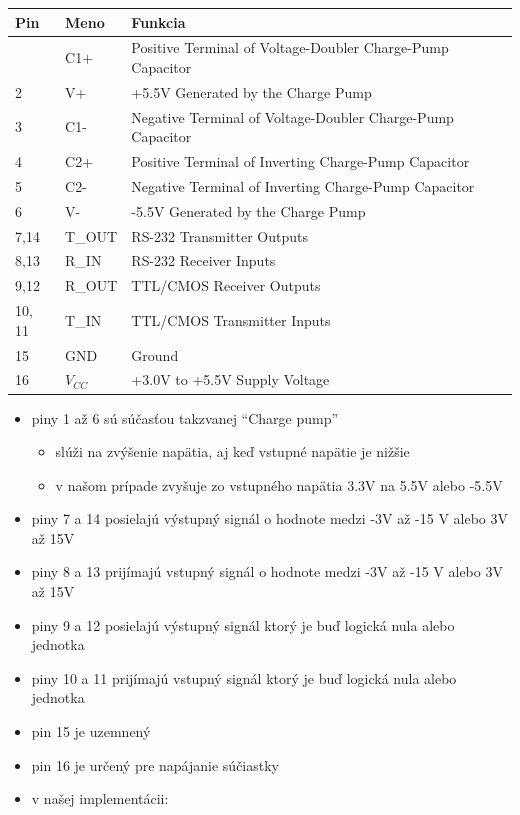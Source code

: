 \begin{itemize}
  \begin{longtable}[]{@{}lll@{}}
  \toprule\noalign{}
  Pin & Meno & Funkcia \\
  \midrule\noalign{}
  \endhead
  \bottomrule\noalign{}
  \endlastfoot
  1 & C1+ & Positive Terminal of Voltage-Doubler Charge-Pump
  Capacitor \\
  2 & V+ & +5.5V Generated by the Charge Pump \\
  3 & C1- & Negative Terminal of Voltage-Doubler Charge-Pump
  Capacitor \\
  4 & C2+ & Positive Terminal of Inverting Charge-Pump Capacitor \\
  5 & C2- & Negative Terminal of Inverting Charge-Pump Capacitor \\
  6 & V- & -5.5V Generated by the Charge Pump \\
  7,14 & T\_OUT & RS-232 Transmitter Outputs \\
  8,13 & R\_IN & RS-232 Receiver Inputs \\
  9,12 & R\_OUT & TTL/CMOS Receiver Outputs \\
  10, 11 & T\_IN & TTL/CMOS Transmitter Inputs \\
  15 & GND & Ground \\
  16 & $V_{CC}$ & +3.0V to +5.5V Supply Voltage \\
  \end{longtable}

  \begin{itemize}
  \item
    piny 1 až 6 sú súčasťou takzvanej ``Charge pump''

    \begin{itemize}
    \item
      slúži na zvýšenie napätia, aj keď vstupné napätie je nižšie
    \item
      v našom prípade zvyšuje zo vstupného napätia 3.3V na 5.5V alebo
      -5.5V
    \end{itemize}
  \item
    piny 7 a 14 posielajú výstupný signál o hodnote medzi -3V až -15 V
    alebo 3V až 15V
  \item
    piny 8 a 13 prijímajú vstupný signál o hodnote medzi -3V až -15 V
    alebo 3V až 15V
  \item
    piny 9 a 12 posielajú výstupný signál ktorý je buď logická nula
    alebo jednotka
  \item
    piny 10 a 11 prijímajú vstupný signál ktorý je buď logická nula
    alebo jednotka
  \item
    pin 15 je uzemnený
  \item
    pin 16 je určený pre napájanie súčiastky
  \item
    v našej implementácii:


\end{itemize}
\end{itemize}

